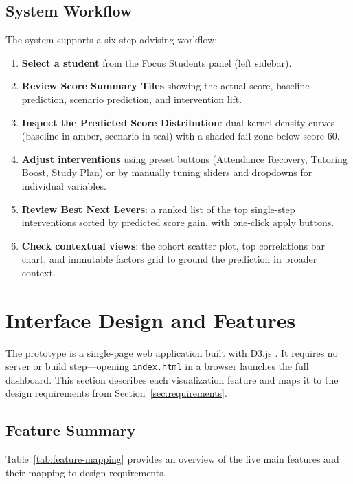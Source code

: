 \documentclass[11pt]{article}
\begin{document}
\subsection{System Workflow}

The system supports a six-step advising workflow:

\begin{enumerate}
  \item \textbf{Select a student} from the Focus Students panel (left sidebar).
  \item \textbf{Review Score Summary Tiles} showing the actual score, baseline prediction, scenario prediction, and intervention lift.
  \item \textbf{Inspect the Predicted Score Distribution}: dual kernel density curves (baseline in amber, scenario in teal) with a shaded fail zone below score 60.
  \item \textbf{Adjust interventions} using preset buttons (Attendance Recovery, Tutoring Boost, Study Plan) or by manually tuning sliders and dropdowns for individual variables.
  \item \textbf{Review Best Next Levers}: a ranked list of the top single-step interventions sorted by predicted score gain, with one-click apply buttons.
  \item \textbf{Check contextual views}: the cohort scatter plot, top correlations bar chart, and immutable factors grid to ground the prediction in broader context.
\end{enumerate}

\section{Interface Design and Features}
\label{sec:interface}

The prototype is a single-page web application built with D3.js \cite{bostock2011}. It requires no server or build step---opening \texttt{index.html} in a browser launches the full dashboard. This section describes each visualization feature and maps it to the design requirements from Section~\ref{sec:requirements}.

\subsection{Feature Summary}

Table~\ref{tab:feature-mapping} provides an overview of the five main features and their mapping to design requirements.
\end{document}
